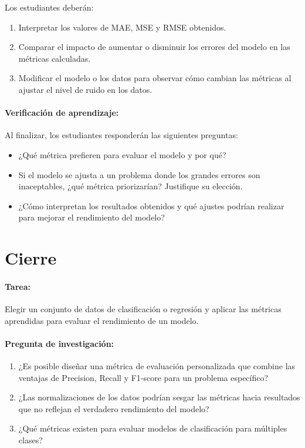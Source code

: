 \documentclass[a4,11pt]{aleph-notas}
\begin{document}
\begin{itemize}[leftmargin=*]
    Los estudiantes deberán:
    \begin{enumerate}
        \item Interpretar los valores de MAE, MSE y RMSE obtenidos.
        \item Comparar el impacto de aumentar o disminuir los errores del modelo en las métricas calculadas.
        \item Modificar el modelo o los datos para observar cómo cambian las métricas al ajustar el nivel de ruido en los datos.
    \end{enumerate}
\end{itemize}

\paragraph{Verificación de aprendizaje:}  
Al finalizar, los estudiantes responderán las siguientes preguntas:
\begin{itemize}
    \item ¿Qué métrica prefieren para evaluar el modelo y por qué?
    \item Si el modelo se ajusta a un problema donde los grandes errores son inaceptables, ¿qué métrica priorizarían? Justifique su elección.
    \item ¿Cómo interpretan los resultados obtenidos y qué ajustes podrían realizar para mejorar el rendimiento del modelo?
\end{itemize}


\section*{Cierre}

\paragraph{Tarea:} Elegir un conjunto de datos de clasificación o regresión y aplicar las métricas aprendidas para evaluar el rendimiento de un modelo.
    
    
\paragraph{Pregunta de investigación:} 
\begin{enumerate}
    \item ¿Es posible diseñar una métrica de evaluación personalizada que combine las ventajas de Precision, Recall y F1-score para un problema específico?
    \item ¿Las normalizaciones de los datos podrían sesgar las métricas hacia resultados que no reflejan el verdadero rendimiento del modelo?
    \item ¿Qué métricas existen para evaluar modelos de clasificación para múltiples clases?

\end{enumerate}
    
\end{document}
